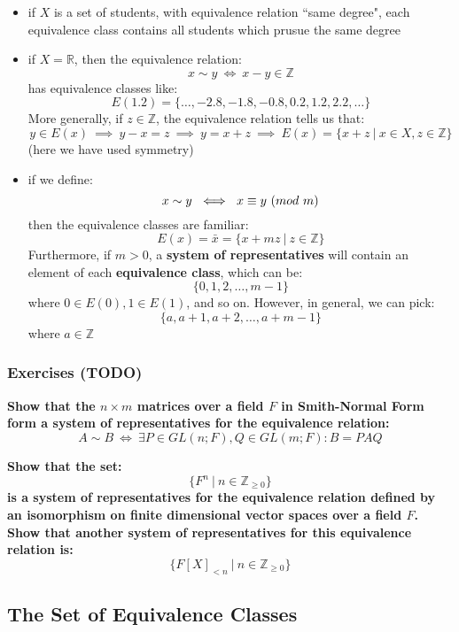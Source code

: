 \documentclass{exam}
\begin{document}
\begin{itemize}
    \item if $X$ is a set of students, with equivalence relation ``same degree", each equivalence class contains all students which prusue the same degree
    \item if $X = \mathbb{R}$, then the equivalence relation:
    \[
    x \sim y \ \iff \ x - y \in \mathbb{Z}
    \]
    has equivalence classes like:
    \[
    E(1.2) = \{\ldots, -2.8, -1.8, -0.8, 0.2, 1.2, 2.2, \ldots\}
    \]
    More generally, if $z \in \mathbb{Z}$, the equivalence relation tells us that:
    \[
    y \in E(x) \ \implies \ y - x = z \ \implies \ y = x + z \ \implies \ E(x) = \{x + z \ | \ x \in X, z \in \mathbb{Z}\}
    \]
    (here we have used symmetry)
    \item if we define:
    \[
    x \sim y \ \iff \ \modulom{x}{y}
    \]
    then the equivalence classes are familiar:
    \[
    E(x) = \bar{x} = \{x + mz \ | \ z \in \mathbb{Z}\}
    \]
    Furthermore, if $m > 0$, a \textbf{system of representatives} will contain an element of each \textbf{equivalence class}, which can be:
    \[
    \{0,1,2,\ldots,m-1\}
    \]
    where $0 \in E(0), 1 \in E(1)$, and so on. However, in general, we can pick:
    \[
    \{a, a+1, a+2, \ldots, a+m-1\}
    \]
    where $a \in \mathbb{Z}$
\end{itemize}

\subsubsection{Exercises (TODO)}

\begin{questions}

\question \textbf{Show that the $n \times m$ matrices over a field $F$ in Smith-Normal Form form a system of representatives for the equivalence relation:
\[
A \sim B \ \iff \ \exists P \in GL(n;F), Q \in GL(m;F) : B = PAQ 
\]}

\question \textbf{Show that the set:
\[
\{F^n \ | \ n \in \mathbb{Z}_{\geq 0}\}
\]
is a system of representatives for the equivalence relation defined by an
isomorphism on finite dimensional vector spaces over a field $F$. Show that another system of representatives for this equivalence relation is:
\[
\{F[X]_{<n} \ | \ n \in \mathbb{Z}_{\geq 0}\}
\]}

\end{questions}

\subsection{The Set of Equivalence Classes}
\end{document}
